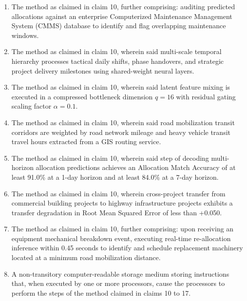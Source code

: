 \documentclass[11pt,a4paper]{article}
\begin{document}
\begin{enumerate}
    \item The method as claimed in claim 10, further comprising: auditing predicted allocations against an enterprise Computerized Maintenance Management System (CMMS) database to identify and flag overlapping maintenance windows.

    \item The method as claimed in claim 10, wherein said multi-scale temporal hierarchy processes tactical daily shifts, phase handovers, and strategic project delivery milestones using shared-weight neural layers.

    \item The method as claimed in claim 10, wherein said latent feature mixing is executed in a compressed bottleneck dimension $q = 16$ with residual gating scaling factor $\alpha = 0.1$.

    \item The method as claimed in claim 10, wherein said road mobilization transit corridors are weighted by road network mileage and heavy vehicle transit travel hours extracted from a GIS routing service.

    \item The method as claimed in claim 10, wherein said step of decoding multi-horizon allocation predictions achieves an Allocation Match Accuracy of at least 91.0\% at a 1-day horizon and at least 84.0\% at a 7-day horizon.

    \item The method as claimed in claim 10, wherein cross-project transfer from commercial building projects to highway infrastructure projects exhibits a transfer degradation in Root Mean Squared Error of less than +0.050.

    \item The method as claimed in claim 10, further comprising: upon receiving an equipment mechanical breakdown event, executing real-time re-allocation inference within 0.45 seconds to identify and schedule replacement machinery located at a minimum road mobilization distance.

    \item A non-transitory computer-readable storage medium storing instructions that, when executed by one or more processors, cause the processors to perform the steps of the method claimed in claims 10 to 17.
\end{enumerate}

\newpage

\end{document}
